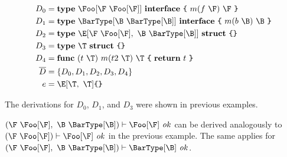 \begin{align*}
    D_0    & = \type~\Foo[\F~\Foo[\F]]~\interface~\br{~m(f~\F)~\F~}         \\
    D_1    & = \type~\BarType[\B~\BarType[\B]]~\interface~\br{~m(b~\B)~\B~} \\
    D_2    & = \type~\E[\F~\Foo[\F],~\B~\BarType[\B]]~\struct~\br{ }        \\
    D_3    & = \type~\T~\struct~\br{ }                                      \\
    D_4    & = \func~(t~\T)~m(t2~\T)~\T~\br{~\return~t~}                    \\
    \ov{D} & = \{D_0, D_1, D_2, D_3, D_4\}                                  \\
    e      & = \E[\T,~\T]\br{}
\end{align*}

The derivations for $D_0$, $D_1$, and $D_3$ were shown in previous examples.

\begin{mathpar}


\end{mathpar}

$(\F~\Foo[\F],~\B~\BarType[\B]) \vdash \Foo[\F] \ok$ can be derived analogously
to $(\F~\Foo[\F]) \vdash \Foo[\F] \ok$ in the previous example. The same applies
for $(\F~\Foo[\F],~\B~\BarType[\B]) \vdash \BarType[\B] \ok$.

